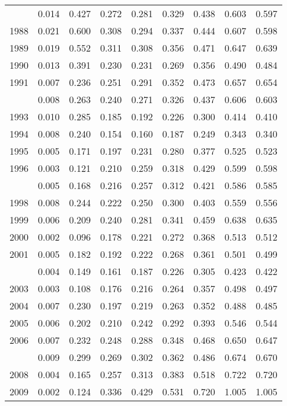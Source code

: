 \documentclass[
]{article}
\begin{document}
\begin{longtable}[t]{lrrrrrrrr}
\endfoot
\bottomrule
\endlastfoot
1987 & 0.014 & 0.427 & 0.272 & 0.281 & 0.329 & 0.438 & 0.603 & 0.597\\
1988 & 0.021 & 0.600 & 0.308 & 0.294 & 0.337 & 0.444 & 0.607 & 0.598\\
1989 & 0.019 & 0.552 & 0.311 & 0.308 & 0.356 & 0.471 & 0.647 & 0.639\\
1990 & 0.013 & 0.391 & 0.230 & 0.231 & 0.269 & 0.356 & 0.490 & 0.484\\
1991 & 0.007 & 0.236 & 0.251 & 0.291 & 0.352 & 0.473 & 0.657 & 0.654\\
\addlinespace
1992 & 0.008 & 0.263 & 0.240 & 0.271 & 0.326 & 0.437 & 0.606 & 0.603\\
1993 & 0.010 & 0.285 & 0.185 & 0.192 & 0.226 & 0.300 & 0.414 & 0.410\\
1994 & 0.008 & 0.240 & 0.154 & 0.160 & 0.187 & 0.249 & 0.343 & 0.340\\
1995 & 0.005 & 0.171 & 0.197 & 0.231 & 0.280 & 0.377 & 0.525 & 0.523\\
1996 & 0.003 & 0.121 & 0.210 & 0.259 & 0.318 & 0.429 & 0.599 & 0.598\\
\addlinespace
1997 & 0.005 & 0.168 & 0.216 & 0.257 & 0.312 & 0.421 & 0.586 & 0.585\\
1998 & 0.008 & 0.244 & 0.222 & 0.250 & 0.300 & 0.403 & 0.559 & 0.556\\
1999 & 0.006 & 0.209 & 0.240 & 0.281 & 0.341 & 0.459 & 0.638 & 0.635\\
2000 & 0.002 & 0.096 & 0.178 & 0.221 & 0.272 & 0.368 & 0.513 & 0.512\\
2001 & 0.005 & 0.182 & 0.192 & 0.222 & 0.268 & 0.361 & 0.501 & 0.499\\
\addlinespace
2002 & 0.004 & 0.149 & 0.161 & 0.187 & 0.226 & 0.305 & 0.423 & 0.422\\
2003 & 0.003 & 0.108 & 0.176 & 0.216 & 0.264 & 0.357 & 0.498 & 0.497\\
2004 & 0.007 & 0.230 & 0.197 & 0.219 & 0.263 & 0.352 & 0.488 & 0.485\\
2005 & 0.006 & 0.202 & 0.210 & 0.242 & 0.292 & 0.393 & 0.546 & 0.544\\
2006 & 0.007 & 0.232 & 0.248 & 0.288 & 0.348 & 0.468 & 0.650 & 0.647\\
\addlinespace
2007 & 0.009 & 0.299 & 0.269 & 0.302 & 0.362 & 0.486 & 0.674 & 0.670\\
2008 & 0.004 & 0.165 & 0.257 & 0.313 & 0.383 & 0.518 & 0.722 & 0.720\\
2009 & 0.002 & 0.124 & 0.336 & 0.429 & 0.531 & 0.720 & 1.005 & 1.005\\

\end{longtable}
\end{document}
